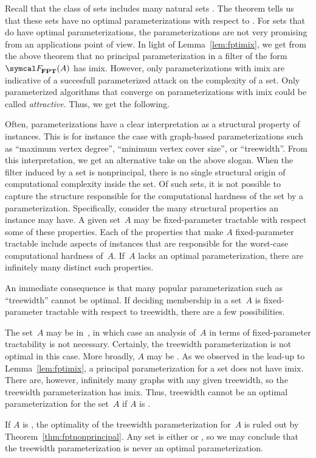 Recall that the class of  sets includes many natural sets \parencite{orponen1986optimal}.
The theorem tells us that these sets have no optimal parameterizations with respect to .
For sets that do have optimal parameterizations, the parameterizations are not very promising from an applications point of view.
In light of Lemma~\ref{lem:fptimix}, we get from the above theorem that no principal parameterization in a filter of the form $\calF_\cl{FPT}(A)$ has imix.
However, only parameterizations with imix are indicative of a succesfull parameterized attack on the complexity of a set.
Only parameterized algorithms that converge on parameterizations with imix could be called \emph{attractive}.
Thus, we get the following.
%

Often, parameterizations have a clear interpretation as a structural property of instances.
This is for instance the case with graph-based parameterizations such as \enquote{maximum vertex degree}, \enquote{minimum vertex cover size}, or \enquote{treewidth}.
From this interpretation, we get an alternative take on the above slogan.
When the filter induced by a set is nonprincipal, there is no single structural origin of computational complexity inside the set.
Of such sets, it is not possible to capture the structure responsible for the computational hardness of the set by a parameterization.
Specifically, consider the many structural properties an instance may have.
A given set~$A$ may be fixed-parameter tractable with respect some of these properties.
Each of the properties that make $A$ fixed-parameter tractable include aspects of instances that are responsible for the worst-case computational hardness of~$A$.
If~$A$ lacks an optimal parameterization, there are infinitely many distinct such properties.
\begin{example}
  An immediate consequence is that many popular parameterization such as \enquote{treewidth} cannot be optimal.
  If deciding membership in a set~$A$ is fixed-parameter tractable with respect to treewidth, there are a few possibilities.

  The set~$A$ may be in~, in which case an analysis of~$A$ in terms of fixed-parameter tractability is not necessary.
  Certainly, the treewidth parameterization is not optimal in this case.
  More broadly, $A$ may be .
  As we observed in the lead-up to Lemma~\ref{lem:fptimix}, a principal parameterization for a  set does not have imix.
  There are, however, infinitely many graphs with any given treewidth, so the treewidth parameterization has imix.
  Thus, treewidth cannot be an optimal parameterization for the set~$A$ if $A$ is .

  If $A$ is , the optimality of the treewidth parameterization for~$A$ is ruled out by Theorem~\ref{thm:fptnonprincipal}.
  Any set is either  or , so we may conclude that the treewidth parameterization is never an optimal parameterization.
\end{example}

